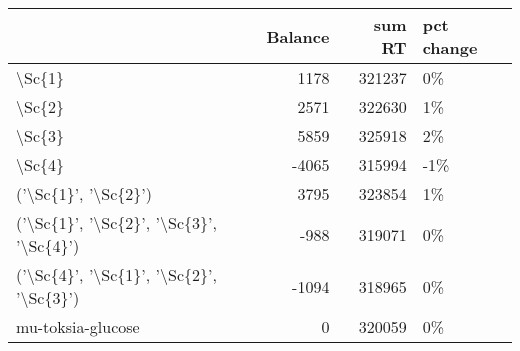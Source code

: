 \begin{tabular}{lrrl}
\toprule
{} &  Balance &  sum RT & pct change \\
\midrule
\textbackslash Sc\{1\}                                   &     1178 &  321237 &         0\% \\
\textbackslash Sc\{2\}                                   &     2571 &  322630 &         1\% \\
\textbackslash Sc\{3\}                                   &     5859 &  325918 &         2\% \\
\textbackslash Sc\{4\}                                   &    -4065 &  315994 &        -1\% \\
('\textbackslash Sc\{1\}', '\textbackslash Sc\{2\}')                     &     3795 &  323854 &         1\% \\
('\textbackslash Sc\{1\}', '\textbackslash Sc\{2\}', '\textbackslash Sc\{3\}', '\textbackslash Sc\{4\}') &     -988 &  319071 &         0\% \\
('\textbackslash Sc\{4\}', '\textbackslash Sc\{1\}', '\textbackslash Sc\{2\}', '\textbackslash Sc\{3\}') &    -1094 &  318965 &         0\% \\
mu-toksia-glucose                        &        0 &  320059 &         0\% \\
\bottomrule
\end{tabular}
